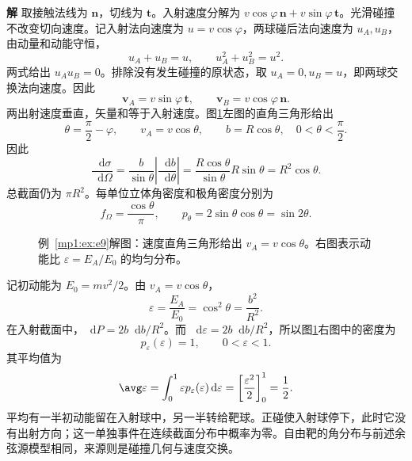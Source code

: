 \documentclass[11pt,openany,fontset=fandol]{ctexbook}
\theoremstyle{definition}\newtheorem{example}{例}[chapter]\newtheorem{exercise}{习题}[chapter]
\newcommand{\SolutionStart}{\par\medskip\ifdim\pagetotal>0pt\ifdim\dimexpr\pagegoal-\pagetotal\relax<3\baselineskip\newpage\fi\fi\noindent\textbf{解}\quad\ignorespaces}
\newenvironment{solution}{\SolutionStart}{\par\medskip}
\newcommand{\dd}{\mathop{}\!\mathrm d}\newcommand{\ee}{\mathrm e}\newcommand{\vct}[1]{\bm{#1}}
\begin{document}
\begin{solution}
取接触法线为 $\vct n$，切线为 $\vct t$。入射速度分解为 $v\cos\varphi\,\vct n+v\sin\varphi\,\vct t$。光滑碰撞不改变切向速度。记入射法向速度为 $u=v\cos\varphi$，两球碰后法向速度为 $u_A,u_B$，由动量和动能守恒，
\[
u_A+u_B=u,\qquad u_A^2+u_B^2=u^2.
\]
两式给出 $u_Au_B=0$。排除没有发生碰撞的原状态，取 $u_A=0,u_B=u$，即两球交换法向速度。因此
\[
\vct v_A=v\sin\varphi\,\vct t,\qquad
\vct v_B=v\cos\varphi\,\vct n.
\]
两出射速度垂直，矢量和等于入射速度。图\ref{mp1:fig:e9-s}左图的直角三角形给出
\[
\theta=\frac\pi2-\varphi,\qquad
v_A=v\cos\theta,\qquad b=R\cos\theta,
\quad 0<\theta<\frac\pi2.
\]
因此
\[
\frac{\dd\sigma}{\dd\Omega}
=\frac{b}{\sin\theta}\left|\frac{\dd b}{\dd\theta}\right|
=\frac{R\cos\theta}{\sin\theta}R\sin\theta
=R^2\cos\theta.
\]
总截面仍为 $\pi R^2$。每单位立体角密度和极角密度分别为
\[
f_\Omega=\frac{\cos\theta}{\pi},\qquad
p_\theta=2\sin\theta\cos\theta=\sin2\theta.
\]

\begin{figure}[H]\centering

\caption{例~\ref{mp1:ex:e9}解图：速度直角三角形给出 $v_A=v\cos\theta$。右图表示动能比 $\varepsilon=E_A/E_0$ 的均匀分布。}\label{mp1:fig:e9-s}
\end{figure}

记初动能为 $E_0=mv^2/2$。由 $v_A=v\cos\theta$，
\[
\varepsilon=\frac{E_A}{E_0}=\cos^2\theta=\frac{b^2}{R^2}.
\]
在入射截面中，$\dd P=2b\dd b/R^2$。而 $\dd\varepsilon=2b\dd b/R^2$，所以图\ref{mp1:fig:e9-s}右图中的密度为
\[
p_\varepsilon(\varepsilon)=1,\qquad 0<\varepsilon<1.
\]
其平均值为
\[
\avg\varepsilon=\int_0^1\varepsilon p_\varepsilon(\varepsilon)\dd\varepsilon
=\left[\frac{\varepsilon^2}{2}\right]_0^1=\frac12.
\]
平均有一半初动能留在入射球中，另一半转给靶球。正碰使入射球停下，此时它没有出射方向；这一单独事件在连续截面分布中概率为零。自由靶的角分布与前述余弦源模型相同，来源则是碰撞几何与速度交换。
\end{solution}
\end{document}
